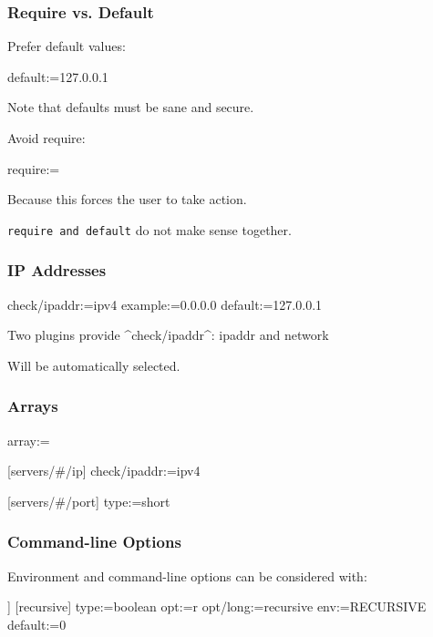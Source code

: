 \begin{frame}[fragile]
	\frametitle{Require vs. Default}
	Prefer default values:
	\begin{code}[gobble=4]
	[server/ip]
	default:=127.0.0.1
	\end{code}

	Note that defaults must be sane and secure.

	\pause
	\vspace{1cm}

	Avoid require:

	\begin{code}[gobble=4]
	[server/ip]
	require:=
	\end{code}

	Because this forces the user to take action.
	\pause

	\begin{warn}
	\texttt{require and default} do not make sense together.
	\end{warn}
\end{frame}

\begin{frame}[fragile]
	\frametitle{IP Addresses}
	\begin{code}[morekeywords={ipaddr,example},gobble=4]
	[server/ip]
	check/ipaddr:=ipv4
	example:=0.0.0.0
	default:=127.0.0.1
	\end{code}

	Two plugins provide ^check/ipaddr^: ipaddr and network

	Will be automatically selected.
\end{frame}

\begin{frame}[fragile]
	\frametitle{Arrays}
	\begin{code}[gobble=4]
	[servers]
	array:=

	[servers/#/ip]
	check/ipaddr:=ipv4

	[servers/#/port]
	type:=short
	\end{code}
\end{frame}

\begin{frame}[fragile]
	\frametitle{Command-line Options}

	Environment and command-line options can be considered with:

	\begin{code}[morekeywords={long,env},gobble=4]]
	[recursive]
	  type:=boolean
	  opt:=r
	  opt/long:=recursive
	  env:=RECURSIVE
	  default:=0
	\end{code}
\end{frame}

